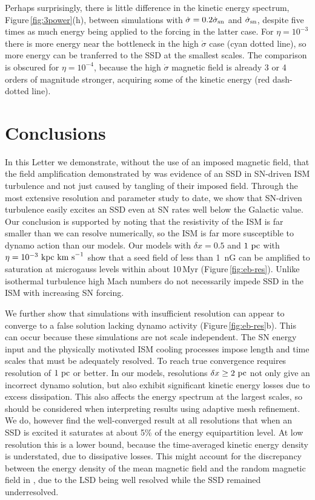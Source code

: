 \documentclass[preprint2]{aastex63}
\newcommand\SNr{\dot\sigma_{\rm sn}}
\newcommand\kpc{~ {\rm kpc}}
\newcommand\pc{~ {\rm pc}}
\newcommand\dx{ {\delta x}}
\newcommand\kms{~ {\rm km~ s}^{-1}}
\begin{document}
 Perhaps surprisingly, there is little difference in the kinetic energy
 spectrum, Figure\,\ref{fig:3power}(h), between simulations with
 $\dot\sigma=0.2\SNr$ and $\SNr$, despite five times as much energy being
 applied to the forcing in the latter case.
 For $\eta=10^{-3}$ there is more energy near the bottleneck in the high
 $\dot\sigma$ case (cyan dotted line), so more energy can be tranferred to
 the SSD at the smallest scales.
 The comparison is obscured for $\eta=10^{-4}$, because the high $\dot\sigma$
 magnetic field is already 3 or 4 orders of magnitude stronger, acquiring some
 of the kinetic energy (red dash-dotted line).

\section{Conclusions}\label{sec:conc}

 In this Letter we demonstrate, without the use of an imposed magnetic field,
 that the field amplification demonstrated by \citet{BKMM04} was evidence of
 an SSD in SN-driven ISM turbulence and not just caused by tangling of their
 imposed field.
 Through the most extensive resolution and parameter study to date, we show
 that SN-driven turbulence easily excites an SSD even at SN rates well below the
 Galactic value.
 Our conclusion is supported by noting that the resistivity of the ISM is far
 smaller than we can resolve numerically, so the ISM is far more susceptible to
 dynamo action than our models.
 Our models with $\dx=0.5$ and $1\pc$ with $\eta=10^{-3}\kpc\kms$ show that a
 seed field of less than 1~nG can be amplified to saturation at microgauss
 levels within about 10\,Myr (Figure\,\ref{fig:eb-res}). 
 Unlike isothermal turbulence high Mach numbers do not necessarily impede SSD
 in the ISM with increasing SN forcing.

 We further show that simulations with insufficient resolution can appear to
 converge to a false solution lacking dynamo activity
 (Figure\,\ref{fig:eb-res}b). This can occur because these simulations are not
 scale independent. 
 The SN energy input and the physically motivated ISM cooling processes impose
 length and time scales that must be adequately resolved.
 To reach true convergence requires resolution of $1\pc$ or better.
 In our models, resolutions $\dx\geq2\pc$ not only give an incorrect dynamo
 solution, but also exhibit significant kinetic energy losses due to excess
 dissipation.
 This also affects the energy spectrum at the largest scales, so should be 
 considered when interpreting results using adaptive mesh refinement.
 We do, however find the well-converged result at all resolutions that when an
 SSD is excited it saturates at about 5\% of the energy equipartition level.
 At low resolution this is a lower bound, because the time-averaged kinetic
 energy density is understated, due to dissipative losses.
 This might account for the discrepancy between the energy density of the mean
 magnetic field and the random magnetic field in \citet{Gent:2013b}, due to the
 LSD being well resolved while the SSD remained underresolved.
\end{document}
